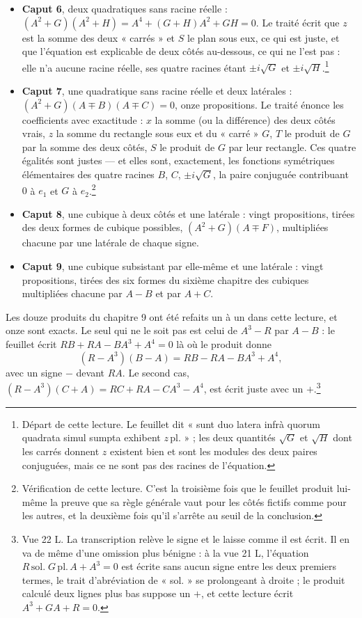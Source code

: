 \documentclass[11pt,a4paper]{article}
\begin{document}
\begin{itemize}
  \item \textbf{Caput 6}, deux quadratiques sans racine réelle :
    $(A^2+G)(A^2+H) = A^4 + (G+H)A^2 + GH = 0$. Le traité écrit que $z$ est la
    somme des deux « carrés » et $S$ le plan sous eux, ce qui est juste, et que
    l'équation est explicable de deux côtés au-dessous, ce qui ne l'est pas :
    elle n'a aucune racine réelle, ses quatre racines étant
    $\pm i\sqrt{G}$ et $\pm i\sqrt{H}$.\footnote{Départ de cette lecture. Le
    feuillet dit « sunt duo latera infrà quorum quadrata simul sumpta exhibent
    $z\,\mathrm{pl.}$ » ; les deux quantités $\sqrt G$ et $\sqrt H$ dont les
    carrés donnent $z$ existent bien et sont les modules des deux paires
    conjuguées, mais ce ne sont pas des racines de l'équation.}
  \item \textbf{Caput 7}, une quadratique sans racine réelle et deux latérales :
    $(A^2+G)(A \mp B)(A \mp C) = 0$, onze propositions. Le traité énonce les
    coefficients avec exactitude : $x$ la somme (ou la différence) des deux
    côtés vrais, $z$ la somme du rectangle sous eux et du « carré » $G$, $T$ le
    produit de $G$ par la somme des deux côtés, $S$ le produit de $G$ par leur
    rectangle. Ces quatre égalités sont justes — et elles sont, exactement, les
    fonctions symétriques élémentaires des quatre racines $B$, $C$,
    $\pm i\sqrt G$, la paire conjuguée contribuant $0$ à $e_1$ et $G$ à
    $e_2$.\footnote{Vérification de cette lecture. C'est la troisième fois que
    le feuillet produit lui-même la preuve que sa règle générale vaut pour les
    côtés fictifs comme pour les autres, et la deuxième fois qu'il s'arrête au
    seuil de la conclusion.}
  \item \textbf{Caput 8}, une cubique à deux côtés et une latérale : vingt
    propositions, tirées des deux formes de cubique possibles,
    $(A^2+G)(A \mp F)$, multipliées chacune par une latérale de chaque signe.
  \item \textbf{Caput 9}, une cubique subsistant par elle-même et une latérale :
    vingt propositions, tirées des six formes du sixième chapitre des cubiques
    multipliées chacune par $A - B$ et par $A + C$.
\end{itemize}

Les douze produits du chapitre 9 ont été refaits un à un dans cette lecture, et
onze sont exacts. Le seul qui ne le soit pas est celui de $A^3 - R$ par $A - B$ :
le feuillet écrit $RB + RA - BA^3 + A^4 = 0$ là où le produit donne
\[ (R - A^3)(B - A) = RB - RA - BA^3 + A^4, \]
avec un signe $-$ devant $RA$. Le second cas, $(R - A^3)(C + A) = RC + RA - CA^3
- A^4$, est écrit juste avec un $+$.\footnote{Vue 22 L. La transcription relève
le signe et le laisse comme il est écrit. Il en va de même d'une omission plus
bénigne : à la vue 21 L, l'équation $R\,\mathrm{sol.} \; G\,\mathrm{pl.}\,A +
A^3 = 0$ est écrite sans aucun signe entre les deux premiers termes, le trait
d'abréviation de « sol. » se prolongeant à droite ; le produit calculé deux
lignes plus bas suppose un $+$, et cette lecture écrit $A^3 + GA + R = 0$.}
\end{document}
